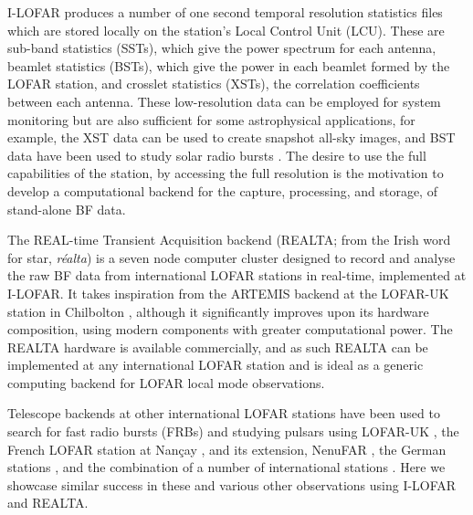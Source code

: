 I-LOFAR produces a number of one second temporal resolution statistics files which are stored locally on the station's Local Control Unit (LCU). These are sub-band statistics (SSTs), which give the power spectrum for each antenna, beamlet statistics (BSTs), which give the power in each beamlet formed by the LOFAR station, and crosslet statistics (XSTs), the correlation coefficients between each antenna. These low-resolution data can be employed for system monitoring but are also sufficient for some astrophysical applications, for example, the XST data can be used to create snapshot all-sky images, and BST data have been used to study solar radio bursts \citep{Maguire2020}. The desire to use the full capabilities of the station, by accessing the full resolution is the motivation to develop a computational backend for the capture,  processing, and storage, of stand-alone BF data. 

The REAL-time Transient Acquisition backend (REALTA; from the Irish word for star, \textit{r\'ealta}) is a seven node computer cluster designed to record and analyse the raw BF data from international LOFAR stations in real-time, implemented at I-LOFAR. It takes inspiration from the ARTEMIS backend at the LOFAR-UK station in Chilbolton \citep{Serylak2012,Karastergiou2015}, although it significantly improves upon its hardware composition, using modern components with greater computational power. The REALTA hardware is available commercially, and as such REALTA can be implemented at any international LOFAR station and is ideal as a generic computing backend for LOFAR local mode observations.

Telescope backends at other international LOFAR stations have been used to search for fast radio bursts (FRBs) and studying pulsars using LOFAR-UK \citep[for example,][]{Karastergiou2015}, the French LOFAR station at Nançay \citep[for example,][]{Rajwade2016,Bondonneau2017}, and its extension, NenuFAR \citep[for example,][]{Bondonneau2020}, the German stations \citep[e.g][]{Donner2019, Porayko2019, Tiburzi2019}, and the combination of a number of international stations \citep[for example,][]{Mereghetti2016, Hermsen2018, Michilli2018}. Here we showcase similar success in these and various other observations using I-LOFAR and REALTA. 


